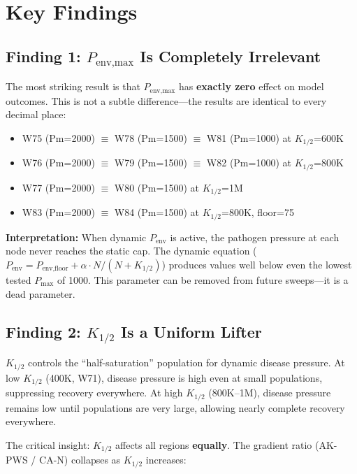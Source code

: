 \documentclass[11pt,a4paper]{article}
\begin{document}
\section{Key Findings}

\subsection{Finding 1: $P_{\text{env,max}}$ Is Completely Irrelevant}

The most striking result is that $P_{\text{env,max}}$ has \textbf{exactly zero} effect on model outcomes. This is not a subtle difference---the results are identical to every decimal place:

\begin{itemize}[nosep]
    \item W75 (Pm=2000) $\equiv$ W78 (Pm=1500) $\equiv$ W81 (Pm=1000) at $K_{1/2}$=600K
    \item W76 (Pm=2000) $\equiv$ W79 (Pm=1500) $\equiv$ W82 (Pm=1000) at $K_{1/2}$=800K
    \item W77 (Pm=2000) $\equiv$ W80 (Pm=1500) at $K_{1/2}$=1M
    \item W83 (Pm=2000) $\equiv$ W84 (Pm=1500) at $K_{1/2}$=800K, floor=75
\end{itemize}

\textbf{Interpretation:} When dynamic $P_{\text{env}}$ is active, the pathogen pressure at each node never reaches the static cap. The dynamic equation ($P_{\text{env}} = P_{\text{env,floor}} + \alpha \cdot N / (N + K_{1/2})$) produces values well below even the lowest tested $P_{\text{max}}$ of 1000. This parameter can be removed from future sweeps---it is a dead parameter.

\subsection{Finding 2: $K_{1/2}$ Is a Uniform Lifter}

$K_{1/2}$ controls the ``half-saturation'' population for dynamic disease pressure. At low $K_{1/2}$ (400K, W71), disease pressure is high even at small populations, suppressing recovery everywhere. At high $K_{1/2}$ (800K--1M), disease pressure remains low until populations are very large, allowing nearly complete recovery everywhere.

The critical insight: $K_{1/2}$ affects all regions \textbf{equally}. The gradient ratio (AK-PWS / CA-N) collapses as $K_{1/2}$ increases:
\end{document}
